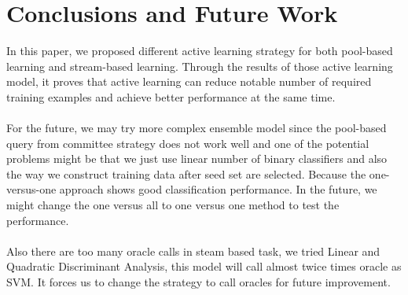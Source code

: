 \documentclass{article}
\begin{document}

\section{Conclusions and Future Work}
In this paper, we proposed different active learning strategy for both pool-based learning and stream-based learning. Through the results of those active learning model, it proves that active learning can reduce notable number of required training examples and achieve better performance at the same time.
\\
\\
For the future, we may try more complex ensemble model since the pool-based query from committee strategy does not work well and one of the potential problems might be that we just use linear number of binary classifiers and also the way we construct training data after seed set are selected. Because the one-versus-one approach \cite{hsu2002comparison} shows good classification performance. In the future, we might change the one versus all to one versus one method to test the performance.
\\
\\
Also there are too many oracle calls in steam based task, we tried Linear and Quadratic Discriminant Analysis, this model will call almost twice times oracle as SVM. It forces us to change the strategy to call oracles for future improvement.





\end{document}
